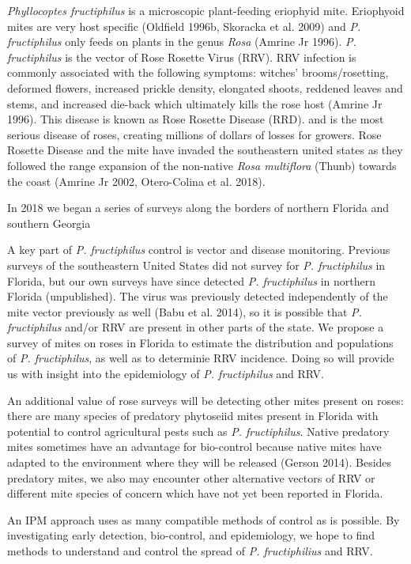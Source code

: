 \documentclass[12pt,final,CPage]{ufthesis}
\begin{document}
{  \emph{Phyllocoptes fructiphilus} is a microscopic plant-feeding eriophyid mite. Eriophyoid mites are very host specific (Oldfield 1996b, Skoracka et al. 2009) and \emph{P. fructiphilus} only feeds on plants in the genus \emph{Rosa} (Amrine Jr 1996). \emph{P. fructiphilus} is the vector of Rose Rosette Virus (RRV). RRV infection is commonly associated with the following symptoms: witches' brooms/rosetting, deformed flowers, increased prickle density, elongated shoots, reddened leaves and stems, and increased die-back
  which ultimately kills the rose host (Amrine Jr 1996). This disease is known as Rose Rosette Disease (RRD). and is the most serious disease of roses, creating millions of dollars of losses for growers. Rose Rosette Disease and the mite have invaded the southeastern united states as they followed the range expansion of the non-native \emph{Rosa multiflora} (Thunb) towards the coast (Amrine Jr 2002, Otero-Colina et al. 2018).

  In 2018 we began a series of surveys along the borders of northern Florida and southern Georgia

  A key part of \emph{P. fructiphilus} control is vector and disease monitoring. Previous surveys of the southeastern United States did not survey for \emph{P. fructiphilus} in Florida, but our own surveys have since detected \emph{P. fructiphilus} in northern Florida (unpublished). The virus was previously detected independently of the mite vector previously as well (Babu et al. 2014), so it is possible that \emph{P. fructiphilus} and/or RRV are present in other parts of the state. We propose a survey of mites on roses in Florida to estimate the distribution and populations of \emph{P. fructiphilus}, as well as to determinie RRV incidence. Doing so will provide us with insight into the epidemiology of \emph{P. fructiphilus} and RRV.

  An additional value of rose surveys will be detecting other mites present on roses: there are many species of predatory phytoseiid mites present in Florida with potential to control agricultural pests such as \emph{P. fructiphilus}. Native predatory mites sometimes have an advantage for bio-control because native mites have adapted to the environment where they will be released (Gerson 2014). Besides predatory mites, we also may encounter other alternative vectors of RRV or different mite species of concern which have not yet been reported in Florida.

  An IPM approach uses as many compatible methods of control as is possible. By investigating early detection, bio-control, and epidemiology, we hope to find methods to understand and control the spread of \emph{P. fructiphilius} and RRV.

}
\end{document}

